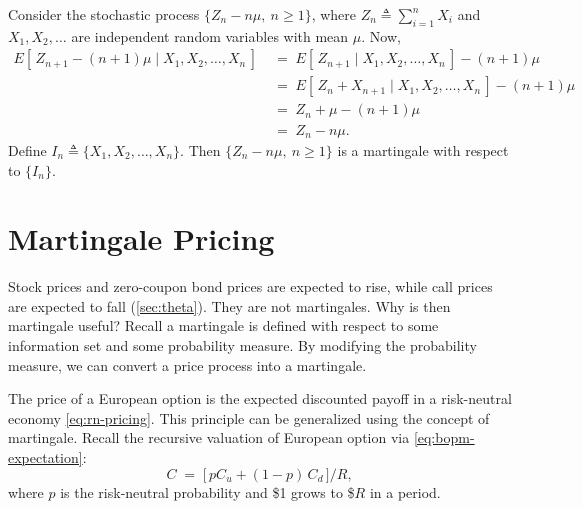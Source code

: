 
\begin{eg}
	Consider the stochastic process $\{Z_{n}-n\mu,\ n\ge1\}$, where $Z_{n}\triangleq\sum_{i=1}^{n}X_{i}$ and $X_{1},X_{2},\dots$ are independent random variables with mean $\mu$.
	Now,
	\begin{align*}
		E[\,Z_{n+1}-(n+1)\mu\mid X_{1},X_{2},\dots,X_{n}\,]
		& \;=\; E[\,Z_{n+1}\mid X_{1},X_{2},\dots,X_{n}\,]-(n+1)\mu \\
		& \;=\; E[\,Z_{n}+X_{n+1}\mid X_{1},X_{2},\dots,X_{n}\,]-(n+1)\mu \\
		& \;=\; Z_{n}+\mu-(n+1)\mu \\
		& \;=\; Z_{n}-n\mu .
	\end{align*}
	Define $I_{n}\triangleq\{X_{1},X_{2},\dots,X_{n}\}$.
	Then $\{Z_{n}-n\mu,\ n\ge1\}$ is a martingale with respect to $\{I_{n}\}$.
\end{eg}

\suppstart
{}
\suppend

\section{Martingale Pricing}
\label{sec:martingale-pricing}


Stock prices and zero-coupon bond prices are expected to rise, while call prices are expected to fall (\autoref{sec:theta}).
They are not martingales.
Why is then martingale useful?
Recall a martingale is defined with respect to some information set and some probability measure.
By modifying the probability measure, we can convert a price process into a martingale.

\suppstart
{}
\suppend

The price of a European option is the expected discounted payoff in a risk-neutral economy \eqref{eq:rn-pricing}.
This principle can be generalized using the concept of martingale.
Recall the recursive valuation of European option via \eqref{eq:bopm-expectation}:
\[
	C \;=\; \bigl[\,pC_{u}+(1-p)\,C_{d}\,\bigr]/R ,
\]
where $p$ is the risk-neutral probability and \$1 grows to \$$R$ in a period.

